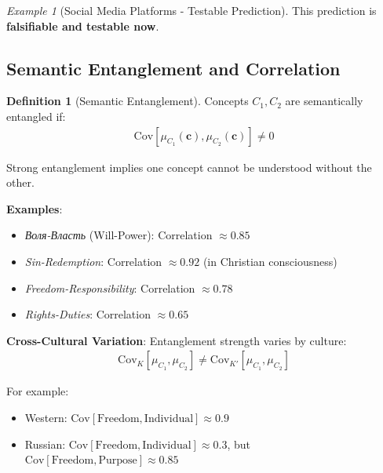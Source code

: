 \documentclass[11pt,a4paper]{article}
\theoremstyle{definition}
\newtheorem{definition}{Definition}[section]
\theoremstyle{remark}
\newtheorem{example}{Example}[section]
\newcommand{\cc}{\mathbf{c}}
\begin{document}
\begin{small}
\begin{example}[Social Media Platforms - Testable Prediction]
This prediction is \textbf{falsifiable and testable now}.
\end{example}

\subsection{Semantic Entanglement and Correlation}

\begin{definition}[Semantic Entanglement]
Concepts \(C_1, C_2\) are semantically entangled if:
\begin{align}
\text{Cov}[\mu_{C_1}(\cc), \mu_{C_2}(\cc)] \neq 0
\end{align}

Strong entanglement implies one concept cannot be understood without the other.

\textbf{Examples}:
\begin{itemize}
    \item \textit{Воля-Власть} (Will-Power): Correlation \(\approx 0.85\)
    \item \textit{Sin-Redemption}: Correlation \(\approx 0.92\) (in Christian consciousness)
    \item \textit{Freedom-Responsibility}: Correlation \(\approx 0.78\)
    \item \textit{Rights-Duties}: Correlation \(\approx 0.65\)
\end{itemize}

\textbf{Cross-Cultural Variation}: Entanglement strength varies by culture:
\begin{align}
\text{Cov}_K[\mu_{C_1}, \mu_{C_2}] \neq \text{Cov}_{K'}[\mu_{C_1}, \mu_{C_2}]
\end{align}

For example:
\begin{itemize}
    \item Western: \(\text{Cov}[\text{Freedom}, \text{Individual}] \approx 0.9\)
    \item Russian: \(\text{Cov}[\text{Freedom}, \text{Individual}] \approx 0.3\), but \(\text{Cov}[\text{Freedom}, \text{Purpose}] \approx 0.85\)
\end{itemize}
\end{definition}

\begin{figure}[H]
\centering
{}
\end{figure}
\end{small}
\end{document}
